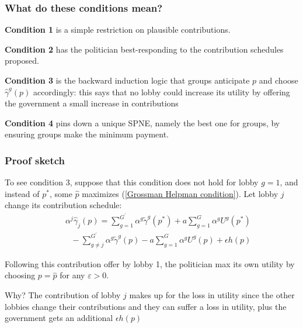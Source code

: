 \documentclass[11pt,aspectratio=169]{beamer}
\begin{document}
\begin{frame}

\frametitle{What do these conditions mean?}

\textbf{Condition 1} is a simple restriction on plausible contributions. 



\textbf{Condition 2} has the politician best-responding to the contribution schedules proposed. 



\textbf{Condition 3} is the backward induction logic that groups anticipate $p$ and choose $\hat{\gamma}^g(p)$ accordingly: this says that no lobby could increase its utility by offering the government a small increase in contributions



\textbf{Condition 4} pins down a unique SPNE, namely the best one for groups, by ensuring groups make the minimum payment.

\end{frame}







\begin{frame}

\frametitle{Proof sketch}

To see condition 3, suppose that this condition does not hold for lobby $g=1$, and instead of $p^*$, some $\hat{p}$ maximizes (\ref{Grossman Helpman condition}). Let lobby $j$ change its contribution schedule:
\begin{eqnarray*}
&&\alpha^j\hat{\gamma}_j(p)=\sum_{g=1}^{G^{\prime
}}\alpha ^{g}\tilde{\gamma}^{g}\left( p^{\ast }\right) +a\sum_{g=1}^{G}\alpha
^{g}U^{g}\left( p^{\ast }\right) \\
&&\text{\ \ \ \ \ \ \ \ \ } -\sum_{g\neq j}^{G^{\prime }}\alpha ^{g}\tilde{\gamma}^{g}\left( p\right) 
-a\sum_{g=1}^{G}\alpha ^{g}U^{g}\left( p\right)
+\epsilon h(p)
\end{eqnarray*}


Following this contribution offer by lobby 1, the politician max its own utility by choosing $p=\hat{p}$ for any $\varepsilon >0$.

Why? The contribution of lobby $j$ makes up for the loss in utility since the other lobbies change their contributions and they can suffer a loss in utility, plus the government gets an additional $\epsilon h(p)$


\end{frame}
\end{document}
